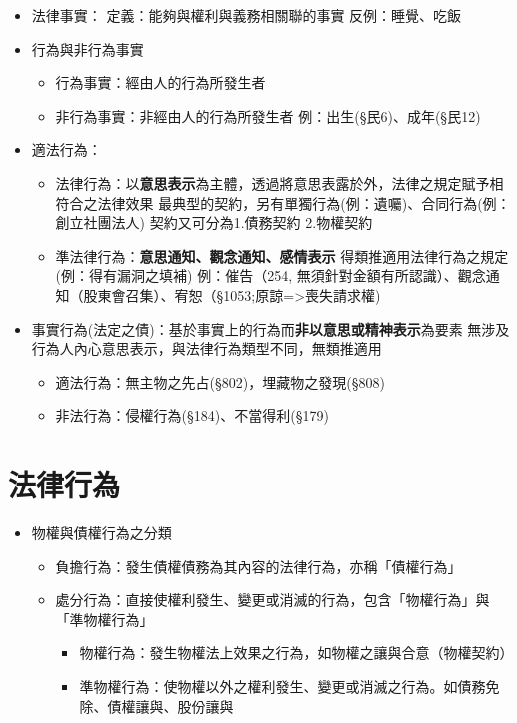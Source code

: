 \documentclass[
]{book}
\begin{document}
\begin{itemize}
\item
  法律事實：
  定義：能夠與權利與義務相關聯的事實
  反例：睡覺、吃飯
\item
  行為與非行為事實

  \begin{itemize}
  \item
    行為事實：經由人的行為所發生者
  \item
    非行為事實：非經由人的行為所發生者
    例：出生(§民6)、成年(§民12)
  \end{itemize}
\item
  適法行為：

  \begin{itemize}
  \item
    法律行為：以\textbf{意思表示}為主體，透過將意思表露於外，法律之規定賦予相符合之法律效果
    最典型的契約，另有單獨行為(例：遺囑)、合同行為(例：創立社團法人)
    契約又可分為1.債務契約 2.物權契約
  \item
    準法律行為：\textbf{意思通知、觀念通知、感情表示}
    得類推適用法律行為之規定(例：得有漏洞之填補)
    例：催告（254, 無須針對金額有所認識）、觀念通知（股東會召集）、宥恕（§1053;原諒=\textgreater 喪失請求權)
  \end{itemize}
\item
  事實行為(法定之債)：基於事實上的行為而\textbf{非以意思或精神表示}為要素
  無涉及行為人內心意思表示，與法律行為類型不同，無類推適用

  \begin{itemize}
  \item
    適法行為：無主物之先占(§802)，埋藏物之發現(§808)
  \item
    非法行為：侵權行為(§184)、不當得利(§179)
  \end{itemize}
\end{itemize}

\hypertarget{ux6cd5ux5f8bux884cux70ba}{%
\section{法律行為}\label{ux6cd5ux5f8bux884cux70ba}}

\begin{itemize}
\item
  物權與債權行為之分類

  \begin{itemize}
  \item
    負擔行為：發生債權債務為其內容的法律行為，亦稱「債權行為」
  \item
    處分行為：直接使權利發生、變更或消滅的行為，包含「物權行為」與「準物權行為」

    \begin{itemize}
    \item
      物權行為：發生物權法上效果之行為，如物權之讓與合意（物權契約）
    \item
      準物權行為：使物權以外之權利發生、變更或消滅之行為。如債務免除、債權讓與、股份讓與
    \end{itemize}
  \end{itemize}
\end{itemize}

  
\end{document}
